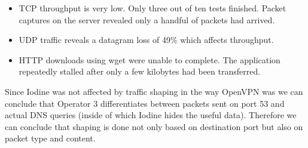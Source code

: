 \begin{itemize}
\item TCP throughput is very low. Only three out of ten tests finished. Packet captures on the server revealed only a handful of packets had arrived.
\item UDP traffic reveals a datagram loss of 49\% which affects throughput.
\item HTTP downloads using wget were unable to complete. The application repeatedly stalled after only a few kilobytes had been transferred.
\end{itemize}

Since Iodine was not affected by traffic shaping in the way OpenVPN was we can
conclude that Operator 3 differentiates between packets sent on port 53 and
actual DNS queries (inside of which Iodine hides the useful data). Therefore we can conclude that shaping is done not only based on destination port but also on packet type and content.
